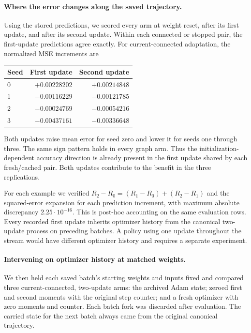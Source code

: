 \documentclass[11pt,a4paper]{article}
\begin{document}
\paragraph{Where the error changes along the saved trajectory.}
Using the stored predictions, we scored every arm at weight reset,
after its first update, and after its second update. Within each
connected or stopped pair, the first-update predictions agree exactly.
For current-connected adaptation, the normalized MSE increments are
\begin{center}
\begin{tabular}{lrr}
\hline
Seed & First update & Second update\\
\hline
0 & $+0.00228202$ & $+0.00214848$\\
1 & $-0.00116229$ & $-0.00121785$\\
2 & $-0.00024769$ & $-0.00054216$\\
3 & $-0.00437161$ & $-0.00336648$\\
\hline
\end{tabular}
\end{center}
Both updates raise mean error for seed zero and lower it for seeds
one through three. The same sign pattern holds in every graph arm.
Thus the initialization-dependent accuracy direction is already present
in the first update shared by each fresh/cached pair. Both updates
contribute to the benefit in the three replications.

For each example we verified
$R_2-R_0=(R_1-R_0)+(R_2-R_1)$ and the squared-error expansion for
each prediction increment, with maximum absolute discrepancy
$2.25\cdot10^{-16}$. This is post-hoc accounting on the same evaluation
rows. Every recorded first update inherits optimizer history from the
canonical two-update process on preceding batches. A policy using one
update throughout the stream would have different optimizer history
and requires a separate experiment.

\paragraph{Intervening on optimizer history at matched weights.}
We then held each saved batch's starting weights and inputs fixed and
compared three current-connected, two-update arms: the archived Adam
state; zeroed first and second moments with the original step counter;
and a fresh optimizer with zero moments and counter. Each batch fork
was discarded after evaluation. The carried state for the next batch
always came from the original canonical trajectory.
\end{document}
